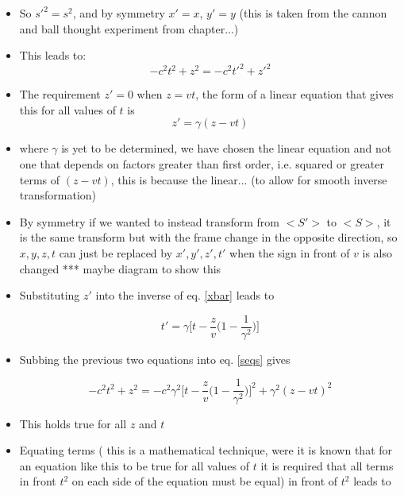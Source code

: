 \begin{itemize}
\item So $s'^2=s^2$, and by symmetry $x'=x$, $y'=y$ (this is taken from the cannon and ball thought experiment from chapter...)

\item This leads to:
\vspace{0cm}
\begin{equation}%
\label{seqs}
-c^2t^2+ z^2 = -c^2t'^2 +z'^2
\end{equation}%

\item The requirement $z'=0$ when $z=vt$, the form of a linear equation that gives this for all values of $t$ is
\vspace{0cm}
\begin{equation}%
\label{xbar}
z' = \gamma (z-vt)
\end{equation}%
\item where $\gamma$ is yet to be determined, we have chosen the linear equation and not one that depends on factors greater than first order, i.e. squared or greater terms of $(z-vt)$, this is because the linear... (to allow for smooth inverse transformation)

\item By symmetry if we wanted to instead transform from $<S'>$ to $<S>$, it is the same transform but with the frame change in the opposite direction, so $x,y,z,t$ can just be replaced by $x',y',z',t'$ when the sign in front of $v$ is also changed *** maybe diagram to show this

\item Substituting $z'$ into the inverse of eq. \eqref{xbar} leads to

\begin{equation}%
\label{ttrans}
    t'=\gamma \bigg[t-\frac{z}{v}\bigg(1-\frac{1}{\gamma^2}\bigg)\bigg]
\end{equation}%

\item Subbing the previous two equations into eq. \eqref{seqs} gives

\begin{equation}%
    -c^2t^2+ z^2 = -c^2\gamma^2\bigg[ t -\frac{z}{v}\bigg(1-\frac{1}{\gamma^2}\bigg)\bigg]^2 + \gamma^2(z-vt)^2
\end{equation}%

\item This holds true for all $z$ and $t$
\item Equating terms ( this is a mathematical technique, were it is known that for an equation like this to be true for all values of $t$ it is required that all terms in front $t^2$ on each side of the equation must be equal) in front of $t^2$ leads to


\end{itemize}
